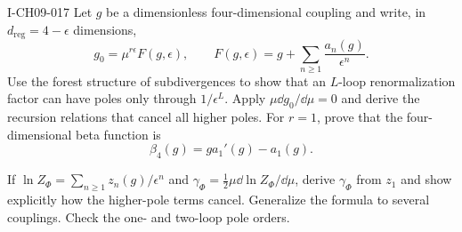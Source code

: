 \begin{exercise}{I-CH09-017}
Let $g$ be a dimensionless four-dimensional coupling and write, in
$d_{\mathrm{reg}}=4-\epsilon$ dimensions,
\[
  g_0=\mu^{r\epsilon}F(g,\epsilon),
  \qquad
  F(g,\epsilon)=g+\sum_{n\geq1}\frac{a_n(g)}{\epsilon^n}.
\]
Use the forest structure of subdivergences to show that an $L$-loop
renormalization factor can have poles only through $1/\epsilon^L$.  Apply
$\mu\dd g_0/\dd\mu=0$ and derive the recursion relations that cancel all
higher poles.  For $r=1$, prove that the four-dimensional beta function is
\[
  \beta_4(g)=g a_1'(g)-a_1(g).
\]

If
$\ln Z_\Phi=\sum_{n\geq1}z_n(g)/\epsilon^n$ and
$\gamma_\Phi=\tfrac12\mu\dd\ln Z_\Phi/\dd\mu$, derive $\gamma_\Phi$ from
$z_1$ and show explicitly how the higher-pole terms cancel.  Generalize the
formula to several couplings.  Check the one- and two-loop pole orders.
\end{exercise}
